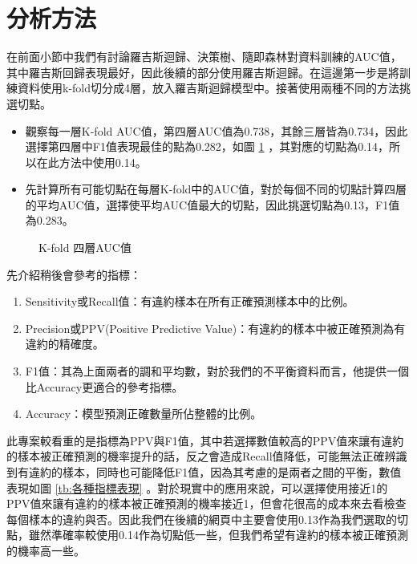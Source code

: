\documentclass[12pt, a4paper]{article}
\begin{document}
\section{分析方法}

在前面小節中我們有討論羅吉斯迴歸、決策樹、隨即森林對資料訓練的AUC值，其中羅吉斯回歸表現最好，因此後續的部分使用羅吉斯迴歸。在這邊第一步是將訓練資料使用k-fold切分成4層，放入羅吉斯迴歸模型中。接著使用兩種不同的方法挑選切點。

\begin{itemize}
\item 觀察每一層K-fold AUC值，第四層AUC值為0.738，其餘三層皆為0.734，因此選擇第四層中F1值表現最佳的點為0.282，如圖 \ref{fig:K-fold 四層AUC值} ，其對應的切點為0.14，所以在此方法中使用0.14。

\item 先計算所有可能切點在每層K-fold中的AUC值，對於每個不同的切點計算四層的平均AUC值，選擇使平均AUC值最大的切點，因此挑選切點為0.13，F1值為0.283。
\end{itemize}

\begin{figure}[h]
    \caption{K-fold 四層AUC值}
    \label{fig:K-fold 四層AUC值}
\end{figure}

先介紹稍後會參考的指標：

\begin{enumerate}
\item Sensitivity或Recall值：有違約樣本在所有正確預測樣本中的比例。
\item Precision或PPV(Positive Predictive Value)：有違約的樣本中被正確預測為有違約的精確度。
\item F1值：其為上面兩者的調和平均數，對於我們的不平衡資料而言，他提供一個比Accuracy更適合的參考指標。
\item Accuracy：模型預測正確數量所佔整體的比例。

\end{enumerate}

此專案較看重的是指標為PPV與F1值，其中若選擇數值較高的PPV值來讓有違約的樣本被正確預測的機率提升的話，反之會造成Recall值降低，可能無法正確辨識到有違約的樣本，同時也可能降低F1值，因為其考慮的是兩者之間的平衡，數值表現如圖 \ref{tb:各種指標表現} 。對於現實中的應用來說，可以選擇使用接近1的PPV值來讓有違約的樣本被正確預測的機率接近1，但會花很高的成本來去看檢查每個樣本的違約與否。因此我們在後續的網頁中主要會使用0.13作為我們選取的切點，雖然準確率較使用0.14作為切點低一些，但我們希望有違約的樣本被正確預測的機率高一些。
\end{document}
